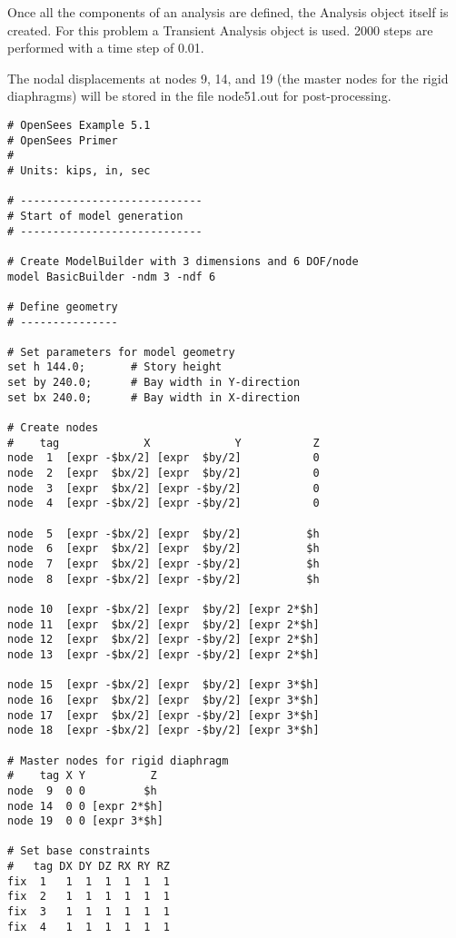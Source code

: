 \documentclass[12pt]{article}
\begin{document}
Once all the components of an analysis are defined, the Analysis
object itself is created.  For this problem a Transient Analysis object
is used. 2000 steps are performed with a time step of 0.01.

\vspace{0.2in} 

The nodal displacements at nodes 9, 14, and 19
(the master nodes for the rigid diaphragms)
will be stored in the file node51.out for post-processing.

\vspace{0.2in} 
{\sf\small
\begin{verbatim}
# OpenSees Example 5.1
# OpenSees Primer
#
# Units: kips, in, sec

# ----------------------------
# Start of model generation
# ----------------------------

# Create ModelBuilder with 3 dimensions and 6 DOF/node
model BasicBuilder -ndm 3 -ndf 6

# Define geometry
# ---------------

# Set parameters for model geometry
set h 144.0;       # Story height
set by 240.0;      # Bay width in Y-direction
set bx 240.0;      # Bay width in X-direction

# Create nodes
#    tag             X             Y           Z 
node  1  [expr -$bx/2] [expr  $by/2]           0
node  2  [expr  $bx/2] [expr  $by/2]           0
node  3  [expr  $bx/2] [expr -$by/2]           0 
node  4  [expr -$bx/2] [expr -$by/2]           0 

node  5  [expr -$bx/2] [expr  $by/2]          $h 
node  6  [expr  $bx/2] [expr  $by/2]          $h 
node  7  [expr  $bx/2] [expr -$by/2]          $h 
node  8  [expr -$bx/2] [expr -$by/2]          $h 

node 10  [expr -$bx/2] [expr  $by/2] [expr 2*$h]
node 11  [expr  $bx/2] [expr  $by/2] [expr 2*$h] 
node 12  [expr  $bx/2] [expr -$by/2] [expr 2*$h] 
node 13  [expr -$bx/2] [expr -$by/2] [expr 2*$h] 

node 15  [expr -$bx/2] [expr  $by/2] [expr 3*$h] 
node 16  [expr  $bx/2] [expr  $by/2] [expr 3*$h] 
node 17  [expr  $bx/2] [expr -$by/2] [expr 3*$h] 
node 18  [expr -$bx/2] [expr -$by/2] [expr 3*$h]

# Master nodes for rigid diaphragm
#    tag X Y          Z 
node  9  0 0         $h 
node 14  0 0 [expr 2*$h]
node 19  0 0 [expr 3*$h]

# Set base constraints
#   tag DX DY DZ RX RY RZ
fix  1   1  1  1  1  1  1
fix  2   1  1  1  1  1  1
fix  3   1  1  1  1  1  1
fix  4   1  1  1  1  1  1


\end{verbatim}}
\end{document}
